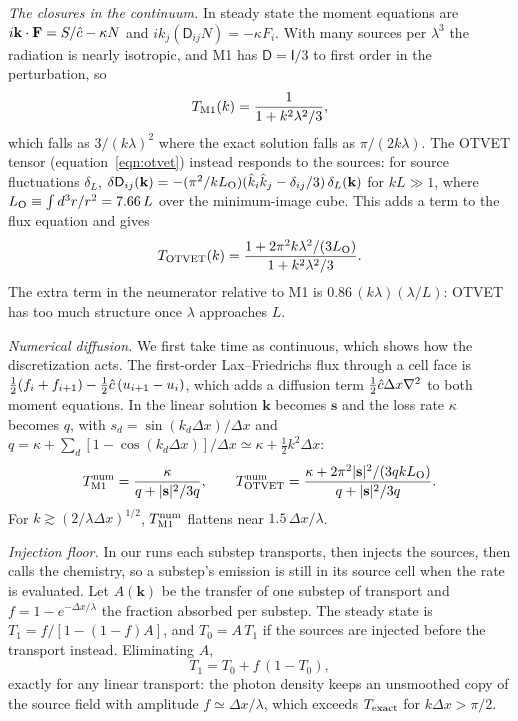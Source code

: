 \emph{The closures in the continuum.} In steady state the moment equations are
$i\mathbf k\cdot\mathbf F=S/\hat{c}-\kappa N$ and $ik_j(\mathsf D_{ij}N)=-\kappa F_i$. With many sources
per $\lambda^3$ the radiation is nearly isotropic, and M1 has $\mathsf D=\mathsf I/3$ to first order in
the perturbation, so
\begin{equation}
T_{\rm M1}(k)=\frac{1}{1+k^2\lambda^2/3},\label{eq:app_m1}
\end{equation}
which falls as $3/(k\lambda)^2$ where the exact solution falls as $\pi/(2k\lambda)$. The OTVET tensor
(equation~\ref{eqn:otvet}) instead responds to the sources: for source fluctuations $\delta_L$,
$\delta\mathsf D_{ij}(\mathbf k)=-(\pi^2/kL_{\rm O})(\hat k_i\hat k_j-\delta_{ij}/3)\,\delta_L(\mathbf k)$
for $kL\gg1$, where $L_{\rm O}\equiv\int d^3r/r^2=7.66\,L$ over the minimum-image cube. This adds a term to
the flux equation and gives \citep{wu21}
\begin{equation}
T_{\rm OTVET}(k)=\frac{1+2\pi^2k\lambda^2/(3L_{\rm O})}{1+k^2\lambda^2/3}.\label{eq:app_otvet}
\end{equation}
The extra term in the neumerator relative to M1 is $0.86\,(k\lambda)(\lambda/L)$: OTVET has too much structure once $\lambda$ approaches $L$.

\emph{Numerical diffusion.} We first take time as continuous, which shows how the discretization acts.
The first-order Lax--Friedrichs flux through a cell face is
$\tfrac12(f_i+f_{i+1})-\tfrac12\hat{c}\,(u_{i+1}-u_i)$, which adds a diffusion term
$\tfrac12\hat{c}\Delta x\nabla^2$ to both moment equations. In the linear solution $\mathbf k$ becomes
$\mathbf s$ and the loss rate $\kappa$ becomes $q$, with
$s_d=\sin(k_d\Delta x)/\Delta x$ and $q=\kappa+\sum_d[1-\cos(k_d\Delta x)]/\Delta x\simeq\kappa+\tfrac12k^2\Delta x$:
\begin{equation}
T^{\rm num}_{\rm M1}=\frac{\kappa}{q+|\mathbf s|^2/3q},\qquad
T^{\rm num}_{\rm OTVET}=\frac{\kappa+2\pi^2|\mathbf s|^2/(3qkL_{\rm O})}{q+|\mathbf s|^2/3q}.\label{eq:app_glf}
\end{equation}
For $k\gtrsim(2/\lambda\Delta x)^{1/2}$, $T^{\rm num}_{\rm M1}$ flattens near $1.5\,\Delta x/\lambda$.

\emph{Injection floor.} In our runs each substep transports, then injects the sources, then calls the
chemistry, so a substep's emission is still in its source cell when the rate is evaluated. Let
$A(\mathbf k)$ be the transfer of one substep of transport and $f=1-e^{-\Delta x/\lambda}$ the fraction
absorbed per substep. The steady state is $T_1=f/[1-(1-f)A]$, and $T_0=A\,T_1$ if the sources are
injected before the transport instead. Eliminating $A$,
\begin{equation}
T_1=T_0+f\,(1-T_0),\label{eq:app_floor}
\end{equation}
exactly for any linear transport: the photon density keeps an unsmoothed copy of the source field with
amplitude $f\simeq\Delta x/\lambda$, which exceeds $T_{\rm exact}$ for $k\Delta x>\pi/2$.

